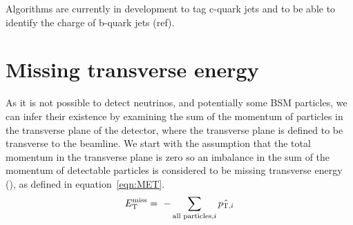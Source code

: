 Algorithms are currently in development to tag c-quark jets and to be able to identify the charge of b-quark jets (ref).

\section{Missing transverse energy ~\label{sec:METreco}}
As it is not possible to detect neutrinos, and potentially some BSM particles, we can infer their existence by examining the sum of the momentum of particles in the transverse plane of the detector, where the transverse plane is defined to be transverse to the beamline. We start with the assumption that the total momentum in the transverse plane is zero so an imbalance in the sum of the momentum of detectable particles is considered to be missing transverse energy (\ETmiss), as defined in equation~\ref{eqn:MET}.
\begin{equation}
E_{\mathrm{T}}^{\text{miss}} = ~- \sum_{\textrm{all particles,}i} \hat{ {p}_{\textrm{T},i} }
\label{eqn:MET}
\end{equation}



